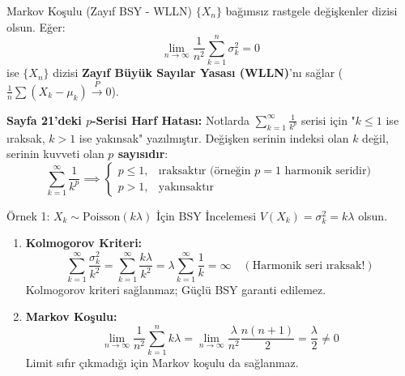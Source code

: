 \documentclass[12pt,a4paper]{article}
\begin{document}
\begin{tanim}{Markov Koşulu (Zayıf BSY - WLLN)}
$\{X_n\}$ bağımsız rastgele değişkenler dizisi olsun. Eğer:
\begin{equation}
    \lim_{n \to \infty} \frac{1}{n^2} \sum_{k=1}^n \sigma_k^2 = 0
\end{equation}
ise $\{X_n\}$ dizisi \textbf{Zayıf Büyük Sayılar Yasası (WLLN)}'nı sağlar ($\frac{1}{n}\sum (X_k - \mu_k) \xrightarrow{P} 0$).
\end{tanim}

\begin{uyari}
\textbf{Sayfa 21'deki $p$-Serisi Harf Hatası:}
Notlarda $\sum_{k=1}^\infty \frac{1}{k^p}$ serisi için "$k \le 1$ ise ıraksak, $k > 1$ ise yakınsak" yazılmıştır. Değişken serinin indeksi olan $k$ değil, serinin kuvveti olan \textbf{$p$ sayısıdır}:
\begin{equation}
    \sum_{k=1}^{\infty} \frac{1}{k^p} \implies 
    \begin{cases}
        p \le 1, & \text{ıraksaktır (örneğin } p=1 \text{ harmonik seridir)} \\
        p > 1, & \text{yakınsaktır}
    \end{cases}
\end{equation}
\end{uyari}

\begin{ornek}{Örnek 1: $X_k \sim \text{Poisson}(k\lambda)$ İçin BSY İncelemesi}
$V(X_k) = \sigma_k^2 = k\lambda$ olsun.
\begin{enumerate}
    \item \textbf{Kolmogorov Kriteri:}
    \begin{equation}
        \sum_{k=1}^{\infty} \frac{\sigma_k^2}{k^2} = \sum_{k=1}^{\infty} \frac{k\lambda}{k^2} = \lambda \sum_{k=1}^{\infty} \frac{1}{k} = \infty \quad (\text{Harmonik seri ıraksak!})
    \end{equation}
    Kolmogorov kriteri sağlanmaz; Güçlü BSY garanti edilemez.

    \item \textbf{Markov Koşulu:}
    \begin{equation}
        \lim_{n \to \infty} \frac{1}{n^2} \sum_{k=1}^n k\lambda = \lim_{n \to \infty} \frac{\lambda}{n^2} \frac{n(n+1)}{2} = \frac{\lambda}{2} \neq 0
    \end{equation}
    Limit sıfır çıkmadığı için Markov koşulu da sağlanmaz.
\end{enumerate}
\end{ornek}
\end{document}

